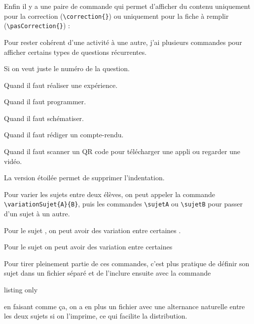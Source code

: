 Enfin il y a une paire de commande qui permet d'afficher du contenu uniquement pour la correction (\lstinline|\correction{}|) ou uniquement pour la fiche à remplir (\lstinline|\pasCorrection{}|) :
\begin{boiteCodeTex}{}

  \modeCorrection
  \modeEleve
\end{boiteCodeTex}


Pour rester cohérent d'une activité à une autre, j'ai plusieurs commandes pour afficher certains types de questions récurrentes.
\begin{boiteCodeTex}{}

  \numeroQuestion Si on veut juste le numéro de la question.

  \mesure Quand il faut réaliser une expérience.

  \programmation Quand il faut programmer.

  \schematisation Quand il faut schématiser.

  \documentaire Quand il faut rédiger un compte-rendu.

  \telechargement Quand il faut scanner un QR code pour télécharger une appli ou regarder une vidéo.

  \mesure* La version étoilée permet de supprimer l'indentation.
\end{boiteCodeTex}


Pour varier les sujets entre deux élèves, on peut appeler la commande \lstinline|\variationSujet{A}{B}|, puis les commandes \lstinline|\sujetA| ou \lstinline|\sujetB| pour passer d'un sujet à un autre.
\begin{boiteCodeTex}{}
  \sujetA
  Pour le sujet , on peut avoir des variation entre certaines .
  
  \sujetB
  Pour le sujet  on peut avoir des variation entre certaines 
\end{boiteCodeTex}
Pour tirer pleinement partie de ces commandes, c'est plus pratique de définir son sujet dans un fichier séparé et de l'inclure ensuite avec la commande \lstinline||
\begin{boiteCodeTex}{listing only}
  \sujetA 
  \sujetB 
\end{boiteCodeTex}
en faisant comme ça, on a en plus un fichier avec une alternance naturelle entre les deux sujets si on l'imprime, ce qui facilite la distribution.

